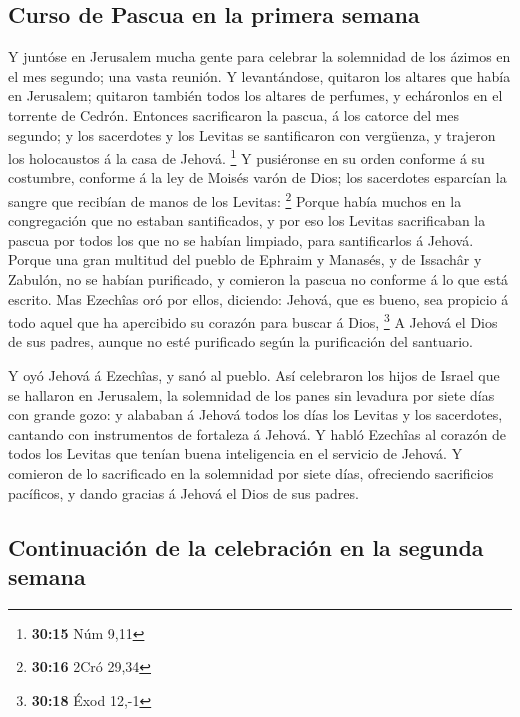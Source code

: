 \hypertarget{curso-de-pascua-en-la-primera-semana}{%
\subsection{Curso de Pascua en la primera
semana}\label{curso-de-pascua-en-la-primera-semana}}

 Y juntóse en Jerusalem mucha gente para celebrar la
solemnidad de los ázimos en el mes segundo; una vasta reunión.
 Y levantándose, quitaron los altares que había en
Jerusalem; quitaron también todos los altares de perfumes, y echáronlos
en el torrente de Cedrón.  Entonces sacrificaron la
pascua, á los catorce del mes segundo; y los sacerdotes y los Levitas se
santificaron con vergüenza, y trajeron los holocaustos á la casa de
Jehová. \footnote{\textbf{30:15} Núm 9,11}  Y pusiéronse
en su orden conforme á su costumbre, conforme á la ley de Moisés varón
de Dios; los sacerdotes esparcían la sangre que recibían de manos de los
Levitas: \footnote{\textbf{30:16} 2Cró 29,34}  Porque
había muchos en la congregación que no estaban santificados, y por eso
los Levitas sacrificaban la pascua por todos los que no se habían
limpiado, para santificarlos á Jehová.  Porque una gran
multitud del pueblo de Ephraim y Manasés, y de Issachâr y Zabulón, no se
habían purificado, y comieron la pascua no conforme á lo que está
escrito. Mas Ezechîas oró por ellos, diciendo: Jehová, que es bueno, sea
propicio á todo aquel que ha apercibido su corazón para buscar á Dios,
\footnote{\textbf{30:18} Éxod 12,-1}  A Jehová el Dios de
sus padres, aunque no esté purificado según la purificación del
santuario.

 Y oyó Jehová á Ezechîas, y sanó al pueblo.
 Así celebraron los hijos de Israel que se hallaron en
Jerusalem, la solemnidad de los panes sin levadura por siete días con
grande gozo: y alababan á Jehová todos los días los Levitas y los
sacerdotes, cantando con instrumentos de fortaleza á Jehová.
 Y habló Ezechîas al corazón de todos los Levitas que
tenían buena inteligencia en el servicio de Jehová. Y comieron de lo
sacrificado en la solemnidad por siete días, ofreciendo sacrificios
pacíficos, y dando gracias á Jehová el Dios de sus padres.

\hypertarget{continuaciuxf3n-de-la-celebraciuxf3n-en-la-segunda-semana}{%
\subsection{Continuación de la celebración en la segunda
semana}\label{continuaciuxf3n-de-la-celebraciuxf3n-en-la-segunda-semana}}

